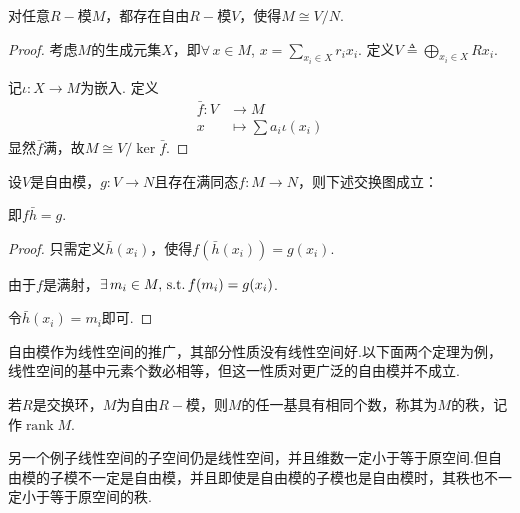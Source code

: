 \begin{proposition}[]
    对任意$R-\!\!$模$M$，都存在自由$R-\!\!$模$V$，使得$M \cong V/N$.
\end{proposition}

\begin{proof}
    考虑$M$的生成元集$X$，即$\forall\, x \in M$, $x = \sum_{x_i \in X} r_i x_i$. 定义$V \triangleq \bigoplus_{x_i \in X} R x_i$.\par
    记$\iota: X \to M$为嵌入. 定义\begin{align*}
        \bar{f}: V &\to M \\
        x &\mapsto \sum a_i \iota(x_i)
    \end{align*}
    显然$\bar{f}$满，故$M \cong V / \ker \bar{f}$.
\end{proof}

\begin{proposition}[]
    设$V$是自由模，$g: V \to N$且存在满同态$f: M \to N$，则下述交换图成立：
    \begin{center}
    \end{center}
    即$f \bar{h} = g$.
\end{proposition}

\begin{proof}
    只需定义$\bar{h}(x_i)$，使得$f(\bar{h}(x_i)) = g(x_i)$.\par
    由于$f$是满射，$\exists\, m_i \in M, \operatorname{\,\text{s.t.}} f(m_i) = g(x_i)$.\par
    令$\bar{h}(x_i) = m_i$即可.
\end{proof}

自由模作为线性空间的推广，其部分性质没有线性空间好.以下面两个定理为例，线性空间的基中元素个数必相等，但这一性质对更广泛的自由模并不成立.

\begin{theorem}[]
    若$R$是交换环，$M$为自由$R-\!\!$模，则$M$的任一基具有相同个数，称其为$M$的秩，记作$\operatorname{rank} M$.
\end{theorem}

另一个例子线性空间的子空间仍是线性空间，并且维数一定小于等于原空间.但自由模的子模不一定是自由模，并且即使是自由模的子模也是自由模时，其秩也不一定小于等于原空间的秩.


